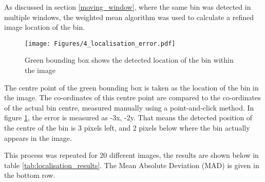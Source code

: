 As discussed in section \ref{moving_window}, where the same bin was detected in multiple windows, the weighted mean algorithm was used to calculate a refined image location of the bin.

\begin{figure}[H]
\centering
\texttt{[image: Figures/4\_localisation\_error.pdf]}
\decoRule
\caption[Localisation Accuracy]{Green bounding box shows the detected location of the bin within the image}
\label{fig:localisation_error}
\end{figure}

The centre point of the green bounding box is taken as the location of the bin in the image. The co-ordinates of this centre point are compared to the co-ordinates of the actual bin centre, measured manually using a point-and-click method. In figure \ref{fig:localisation_error}, the error is measured as -3x, -2y. That means the detected position of the centre of the bin is 3 pixels left, and 2 pixels below where the bin actually appears in the image.

This process was repeated for 20 different images, the results are shown below in table \ref{tab:localisation_results}. The Mean Absolute Deviation (MAD) is given in the bottom row.

